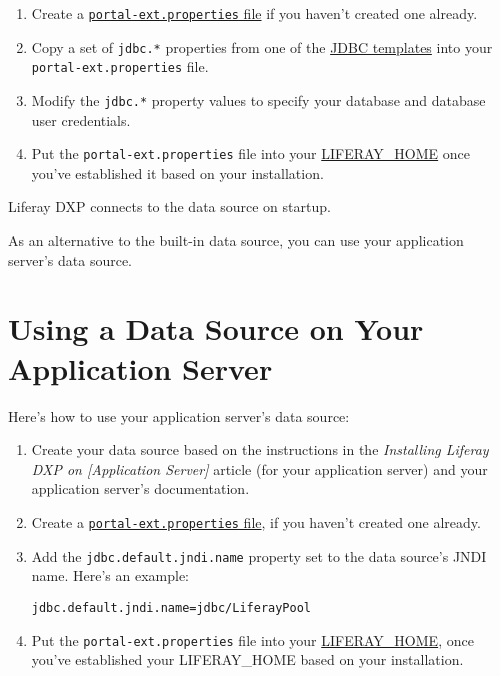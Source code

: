 \begin{enumerate}
\def\labelenumi{\arabic{enumi}.}
\item
  Create a
  \href{/docs/7-2/deploy/-/knowledge_base/d/portal-properties}{\texttt{portal-ext.properties}
  file} if you haven't created one already.
\item
  Copy a set of \texttt{jdbc.*} properties from one of the
  \href{/docs/7-2/deploy/-/knowledge_base/d/database-templates}{JDBC
  templates} into your \texttt{portal-ext.properties} file.
\item
  Modify the \texttt{jdbc.*} property values to specify your database
  and database user credentials.
\item
  Put the \texttt{portal-ext.properties} file into your
  \href{/docs/7-2/deploy/-/knowledge_base/d/liferay-home}{LIFERAY\_HOME}
  once you've established it based on your installation.
\end{enumerate}

Liferay DXP connects to the data source on startup.

As an alternative to the built-in data source, you can use your
application server's data source.

\section{Using a Data Source on Your Application
Server}\label{using-a-data-source-on-your-application-server}

Here's how to use your application server's data source:

\begin{enumerate}
\def\labelenumi{\arabic{enumi}.}
\item
  Create your data source based on the instructions in the
  \emph{Installing Liferay DXP on {[}Application Server{]}} article (for
  your application server) and your application server's documentation.
\item
  Create a
  \href{/docs/7-2/deploy/-/knowledge_base/d/portal-properties}{\texttt{portal-ext.properties}
  file}, if you haven't created one already.
\item
  Add the \texttt{jdbc.default.jndi.name} property set to the data
  source's JNDI name. Here's an example:

\begin{verbatim}
jdbc.default.jndi.name=jdbc/LiferayPool
\end{verbatim}
\item
  Put the \texttt{portal-ext.properties} file into your
  \href{/docs/7-2/deploy/-/knowledge_base/d/liferay-home}{LIFERAY\_HOME},
  once you've established your LIFERAY\_HOME based on your installation.
\end{enumerate}

